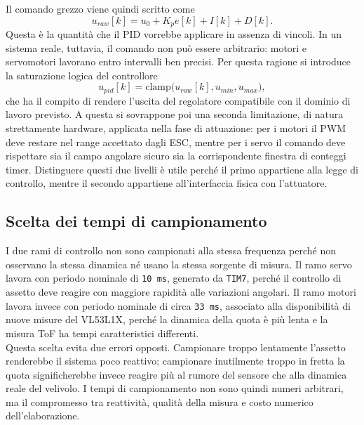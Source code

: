 \documentclass[11pt]{report}
\begin{document}
	Il comando grezzo viene quindi scritto come
	\begin{equation}
		u_{raw}[k]=u_0 + K_p e[k] + I[k] + D[k].
	\end{equation}
	Questa è la quantità che il PID vorrebbe applicare in assenza di vincoli. In un sistema reale, tuttavia, il comando non può essere arbitrario: motori e servomotori lavorano entro intervalli ben precisi. Per questa ragione si introduce la saturazione logica del controllore
	\begin{equation}
		u_{pid}[k]=\mathrm{clamp}\bigl(u_{raw}[k],u_{min},u_{max}\bigr),
	\end{equation}
	che ha il compito di rendere l'uscita del regolatore compatibile con il dominio di lavoro previsto. A questa si sovrappone poi una seconda limitazione, di natura strettamente hardware, applicata nella fase di attuazione: per i motori il PWM deve restare nel range accettato dagli ESC, mentre per i servo il comando deve rispettare sia il campo angolare sicuro sia la corrispondente finestra di conteggi timer. Distinguere questi due livelli è utile perché il primo appartiene alla legge di controllo, mentre il secondo appartiene all'interfaccia fisica con l'attuatore.

	\subsection{Scelta dei tempi di campionamento}
	I due rami di controllo non sono campionati alla stessa frequenza perché non osservano la stessa dinamica né usano la stessa sorgente di misura. Il ramo servo lavora con periodo nominale di \texttt{10 ms}, generato da \texttt{TIM7}, perché il controllo di assetto deve reagire con maggiore rapidità alle variazioni angolari. Il ramo motori lavora invece con periodo nominale di circa \texttt{33 ms}, associato alla disponibilità di nuove misure del VL53L1X, perché la dinamica della quota è più lenta e la misura ToF ha tempi caratteristici differenti.\\
	Questa scelta evita due errori opposti. Campionare troppo lentamente l'assetto renderebbe il sistema poco reattivo; campionare inutilmente troppo in fretta la quota significherebbe invece reagire più al rumore del sensore che alla dinamica reale del velivolo. I tempi di campionamento non sono quindi numeri arbitrari, ma il compromesso tra reattività, qualità della misura e costo numerico dell'elaborazione.
\end{document}
